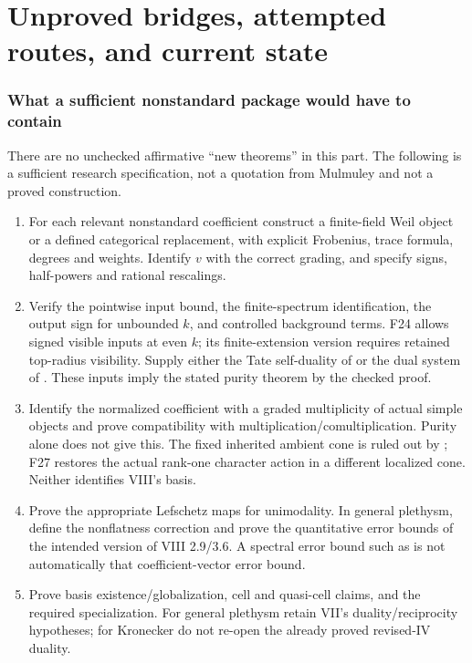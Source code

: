 \part{Unproved bridges, attempted routes, and current state}
\section{What a sufficient nonstandard package would have to contain}\label{sec:gates}
There are no unchecked affirmative ``new theorems'' in this part. The following is a sufficient research specification, not a quotation from Mulmuley and not a proved construction.

\begin{enumerate}
\item {} For each relevant nonstandard coefficient construct a finite-field Weil object or a defined categorical replacement, with explicit Frobenius, trace formula, degrees and weights. Identify $v$ with the correct grading, and specify signs, half-powers and rational rescalings.
\item {} Verify the pointwise input bound, the finite-spectrum identification, the output sign for unbounded $k$, and controlled background terms. F24 allows signed visible inputs at even $k$; its finite-extension version requires retained top-radius visibility. Supply either the Tate self-duality of  or the dual system of . These inputs imply the stated purity theorem by the checked proof.
\item {} Identify the normalized coefficient with a graded multiplicity of actual simple objects and prove compatibility with multiplication/comultiplication. Purity alone does not give this. The fixed inherited ambient cone is ruled out by ; F27 restores the actual rank-one character action in a different localized cone. Neither identifies VIII's basis.
\item {} Prove the appropriate Lefschetz maps for unimodality. In general plethysm, define the nonflatness correction and prove the quantitative error bounds of the intended version of VIII 2.9/3.6. A spectral error bound such as  is not automatically that coefficient-vector error bound.
\item {} Prove basis existence/globalization, cell and quasi-cell claims, and the required specialization. For general plethysm retain VII's duality/reciprocity hypotheses; for Kronecker do not re-open the already proved revised-IV duality.

\end{enumerate}
